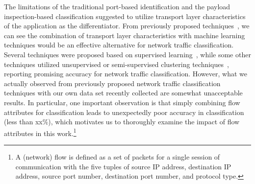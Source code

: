 \documentclass[conference]{IEEEtran}
\begin{document}
The limitations of the traditional port-based identification and the payload inspection-based classification suggested to utilize  transport layer characteristics of the application as the differentiator. From previously proposed techniques~\cite{}, we can see the combination of transport layer characteristics with machine learning techniques would be an effective alternative for network traffic classification. %
Several techniques were proposed based on supervised learning~\cite{}, while some other techniques utilized unsupervised or semi-supervised clustering techniques~\cite{}, reporting promising  accuracy for network traffic classification.
However, what we actually observed from previously proposed network traffic classification techniques with our own data set recently collected are somewhat unacceptable results. In particular, one important observation is that simply combining flow attributes for classification leads to unexpectedly poor accuracy in classification (less than xx\%), which motivates us to thoroughly examine the impact of flow attributes in this work.\footnote{A (network) flow is defined as a set of packets for a single session of communication with the five tuples of source IP address, destination IP address, source port number, destination port number, and protocol type.} 

\end{document}
